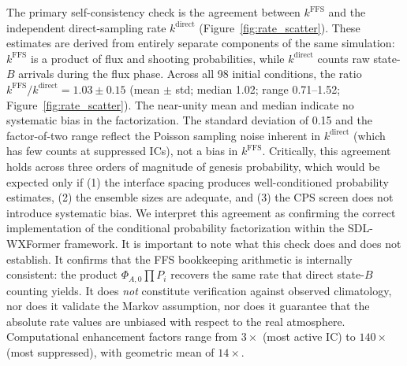 \documentclass[11pt]{article}
\begin{document}
The primary self-consistency check is the agreement between $k^{\text{FFS}}$ and the
independent direct-sampling rate $k^{\text{direct}}$ (Figure~\ref{fig:rate_scatter}).
These estimates are derived from entirely separate components of the same simulation:
$k^{\text{FFS}}$ is a product of flux and shooting probabilities, while $k^{\text{direct}}$
counts raw state-$B$ arrivals during the flux phase.
Across all 98 initial conditions, the ratio $k^{\text{FFS}}/k^{\text{direct}} = 1.03 \pm 0.15$
(mean $\pm$ std; median 1.02; range 0.71--1.52; Figure~\ref{fig:rate_scatter}).
The near-unity mean and median indicate no systematic bias in the factorization.
The standard deviation of 0.15 and the factor-of-two range reflect the Poisson
sampling noise inherent in $k^{\text{direct}}$ (which has few counts at suppressed ICs),
not a bias in $k^{\text{FFS}}$.
Critically, this agreement holds across three orders of magnitude of genesis probability,
which would be expected only if (1) the interface spacing produces well-conditioned
probability estimates, (2) the ensemble sizes are adequate, and (3) the CPS screen
does not introduce systematic bias.
We interpret this agreement as confirming the correct implementation of the conditional
probability factorization within the SDL-WXFormer framework.
It is important to note what this check does and does not establish.
It confirms that the FFS bookkeeping arithmetic is internally consistent: the product
$\Phi_{A,0}\prod P_i$ recovers the same rate that direct state-$B$ counting yields.
It does \emph{not} constitute verification against observed climatology, nor does it
validate the Markov assumption, nor does it guarantee that the absolute
rate values are unbiased with respect to the real atmosphere.
Computational enhancement factors range from $3\times$ (most active IC) to $140\times$
(most suppressed), with geometric mean of $14\times$.
\end{document}
